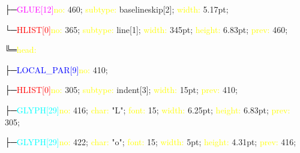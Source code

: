 \documentclass{article}
\begin{document}
\begin{nodetreeexample}
  ├─\textcolor{magenta}{GLUE[12]\hspace{1em}}\textcolor{yellow}{no:} 460; \textcolor{yellow}{subtype:} baselineskip[2]; \textcolor{yellow}{width:} 5.17pt; \par
  └─\textcolor{red}{HLIST[0]\hspace{1em}}\textcolor{yellow}{no:} 365; \textcolor{yellow}{subtype:} line[1]; \textcolor{yellow}{width:} 345pt; \textcolor{yellow}{height:} 6.83pt; \textcolor{yellow}{prev:} 460; \par
  \hspace{1em}\hspace{1em}╚═\textcolor{yellow}{head:}\par
  \hspace{1em}\hspace{1em}\hspace{1em}\hspace{1em}├─\textcolor{blue}{LOCAL\_PAR[9]\hspace{1em}}\textcolor{yellow}{no:} 410; \par
  \hspace{1em}\hspace{1em}\hspace{1em}\hspace{1em}├─\textcolor{red}{HLIST[0]\hspace{1em}}\textcolor{yellow}{no:} 305; \textcolor{yellow}{subtype:} indent[3]; \textcolor{yellow}{width:} 15pt; \textcolor{yellow}{prev:} 410; \par
  \hspace{1em}\hspace{1em}\hspace{1em}\hspace{1em}├─\textcolor{cyan}{GLYPH[29]\hspace{1em}}\textcolor{yellow}{no:} 416; \textcolor{yellow}{char:} "L"; \textcolor{yellow}{font:} 15; \textcolor{yellow}{width:} 6.25pt; \textcolor{yellow}{height:} 6.83pt; \textcolor{yellow}{prev:} 305; \par
  \hspace{1em}\hspace{1em}\hspace{1em}\hspace{1em}├─\textcolor{cyan}{GLYPH[29]\hspace{1em}}\textcolor{yellow}{no:} 422; \textcolor{yellow}{char:} "o"; \textcolor{yellow}{font:} 15; \textcolor{yellow}{width:} 5pt; \textcolor{yellow}{height:} 4.31pt; \textcolor{yellow}{prev:} 416; \par

\end{nodetreeexample}
\end{document}
